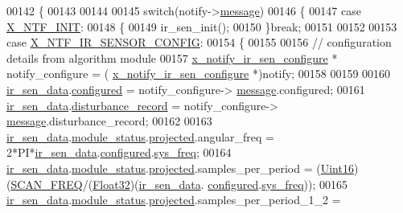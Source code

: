 \begin{DoxyCode}
00142 \{
00143 
00144 
00145     \textcolor{keywordflow}{switch}(notify->\hyperlink{a00036_adf9665938515a20c283eea2c978cf80d}{message})
00146     \{
00147         \textcolor{keywordflow}{case} \hyperlink{a00036_a620b808f2d7b8d2a03c4d026a4c5423c}{X\_NTF\_INIT}:
00148         \{
00149             ir\_sen\_init();
00150         \}\textcolor{keywordflow}{break};
00151 
00152 
00153         \textcolor{keywordflow}{case} \hyperlink{a00017_abb12b7d6a5f3479f552b928bb008d7cd}{X\_NTF\_IR\_SENSOR\_CONFIG}:
00154         \{
00155 
00156             \textcolor{comment}{// configuration details from algorithm module}
00157             \hyperlink{a00017_d9/dbb/a00852}{x\_notify\_ir\_sen\_configure} * notify\_configure = (
      \hyperlink{a00017_d9/dbb/a00852}{x\_notify\_ir\_sen\_configure} *)notify;
00158 
00159 
00160             \hyperlink{a00045_a73dfacb46242746440accc76c7ef710d}{ir\_sen\_data}.\hyperlink{a00023_a94b2d1f6ea4ab334c74d24984dd27843}{configured} = notify\_configure->
      \hyperlink{a00017_a466ed85f7086376a698e191f74f9a0bc}{message}.configured;
00161             \hyperlink{a00045_a73dfacb46242746440accc76c7ef710d}{ir\_sen\_data}.\hyperlink{a00023_ac9b38e2c1d3f1013a88d33506c754152}{disturbance\_record} = notify\_configure->
      \hyperlink{a00017_a466ed85f7086376a698e191f74f9a0bc}{message}.disturbance\_record;
00162 
00163            \hyperlink{a00045_a73dfacb46242746440accc76c7ef710d}{ir\_sen\_data}.\hyperlink{a00023_a5a53c391562b059eb744ac679f3765ca}{module\_status}.\hyperlink{a00017_a6b2516d74583418cec324c50041421c9}{projected}.angular\_freq             = 
      2*PI*\hyperlink{a00045_a73dfacb46242746440accc76c7ef710d}{ir\_sen\_data}.\hyperlink{a00023_a94b2d1f6ea4ab334c74d24984dd27843}{configured}.\hyperlink{a00021_aa57be45aa1320405a885474010159c9e}{sys\_freq};
00164            \hyperlink{a00045_a73dfacb46242746440accc76c7ef710d}{ir\_sen\_data}.\hyperlink{a00023_a5a53c391562b059eb744ac679f3765ca}{module\_status}.\hyperlink{a00017_a6b2516d74583418cec324c50041421c9}{projected}.samples\_per\_period       = 
      (\hyperlink{a00072_a59a9f6be4562c327cbfb4f7e8e18f08b}{Uint16})(\hyperlink{a00021_a8127170b687c1f67a968886c128e76e4}{SCAN\_FREQ}/(\hyperlink{a00072_a87d38f886e617ced2698fc55afa07637}{Float32})(\hyperlink{a00045_a73dfacb46242746440accc76c7ef710d}{ir\_sen\_data}.
      \hyperlink{a00023_a94b2d1f6ea4ab334c74d24984dd27843}{configured}.\hyperlink{a00021_aa57be45aa1320405a885474010159c9e}{sys\_freq}));
00165            \hyperlink{a00045_a73dfacb46242746440accc76c7ef710d}{ir\_sen\_data}.\hyperlink{a00023_a5a53c391562b059eb744ac679f3765ca}{module\_status}.\hyperlink{a00017_a6b2516d74583418cec324c50041421c9}{projected}.samples\_per\_period\_1\_2  = 

\end{DoxyCode}
